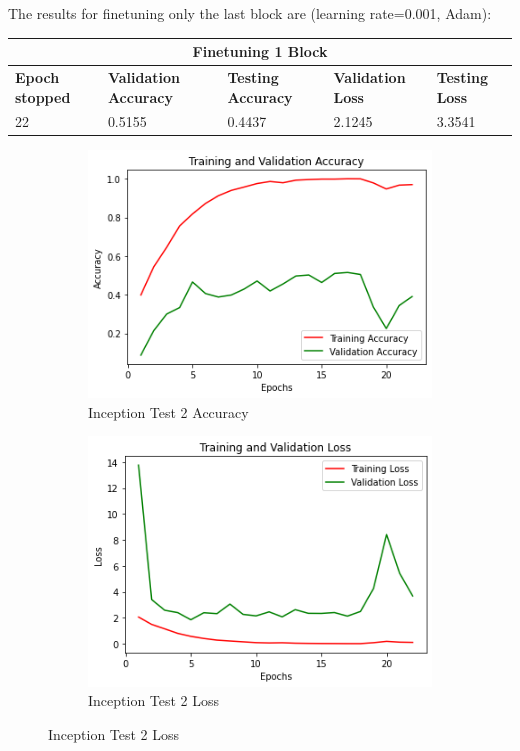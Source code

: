 \noindent The results for finetuning only the last block are (learning rate=0.001, Adam):

\medskip

\begin{tabular}{ |p{2cm}|p{2cm}|p{2cm}|p{2cm}|p{2cm}|  }
\hline
\multicolumn{5}{|c|}{Finetuning 1 Block} \\
\hline
\textbf{Epoch stopped} & \textbf{Validation Accuracy} & \textbf{Testing Accuracy} & \textbf{Validation Loss} & \textbf{Testing Loss} \\
\hline
22 & 0.5155 & 0.4437 & 2.1245 & 3.3541\\
\hline
\end{tabular}

\begin{figure}[H]
	\begin{subfigure}{0.5\textwidth}
		\includegraphics[width=0.9\linewidth]{img/inception/inceptionft1acc.png} 
		\caption{Inception Test 2 Accuracy}
		\label{fig:inceptionft1acc}
	\end{subfigure}
	\begin{subfigure}{0.5\textwidth}
		\includegraphics[width=0.9\linewidth]{img/inception/inceptionft1loss.png}
		\caption{Inception Test 2 Loss}
		\label{fig:inceptionft1loss}
	\end{subfigure}
\end{figure}

